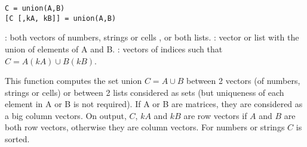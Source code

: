 
\begin{mandesc}
\end{mandesc}

\begin{calling_sequence}
\begin{verbatim}
C = union(A,B)
[C [,kA, kB]] = union(A,B)
\end{verbatim}
\end{calling_sequence}
\begin{parameters}
  \begin{varlist}
    : both vectors of numbers, strings or cells , or both lists.
    : vector or list with the union of elements of A and B.
    : vectors of indices such that $C = A(kA) \cup B(kB)$.
  \end{varlist}
\end{parameters}

\begin{mandescription}
  This function computes the set union $C = A \cup B$
  between 2 vectors (of numbers, strings or cells) or between 2
  lists considered as sets (but uniqueness of each element in A or B is not
  required). If A or B are matrices, they are considered as a big column vectors.
  On output, $C$, $kA$ and $kB$ are row vectors if  $A$ and $B$ are both row vectors, otherwise they
  are column vectors. For numbers or strings $C$ is sorted.
\end{mandescription}

